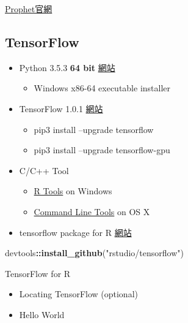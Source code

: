 \documentclass[]{book}
\newenvironment{Shaded}{\begin{snugshade}}{\end{snugshade}}
\newcommand{\KeywordTok}[1]{\textcolor[rgb]{0.13,0.29,0.53}{\textbf{#1}}}
\newcommand{\NormalTok}[1]{#1}
\newcommand{\OperatorTok}[1]{\textcolor[rgb]{0.81,0.36,0.00}{\textbf{#1}}}
\newcommand{\StringTok}[1]{\textcolor[rgb]{0.31,0.60,0.02}{#1}}
\providecommand{\tightlist}{%
  \setlength{\itemsep}{0pt}\setlength{\parskip}{0pt}}
\begin{document}
\href{https://facebookincubator.github.io/prophet/}{Prophet官網}

\hypertarget{tensorflow}{%
\subsection{TensorFlow}\label{tensorflow}}

\begin{itemize}
\tightlist
\item
  Python 3.5.3 \textbf{64 bit} \href{https://www.python.org/downloads/release/python-353/}{網站}

  \begin{itemize}
  \tightlist
  \item
    Windows x86-64 executable installer
  \end{itemize}
\item
  TensorFlow 1.0.1 \href{https://www.tensorflow.org/install/}{網站}

  \begin{itemize}
  \tightlist
  \item
    pip3 install --upgrade tensorflow
  \item
    pip3 install --upgrade tensorflow-gpu
  \end{itemize}
\item
  C/C++ Tool

  \begin{itemize}
  \tightlist
  \item
    \href{https://cran.r-project.org/bin/windows/Rtools/}{R Tools} on Windows
  \item
    \href{http://osxdaily.com/2014/02/12/install-command-line-tools-mac-os-x/}{Command Line Tools} on OS X
  \end{itemize}
\item
  tensorflow package for R \href{https://rstudio.github.io/tensorflow/index.html}{網站}
\end{itemize}

\begin{Shaded}
\begin{Highlighting}[]
\NormalTok{devtools}\OperatorTok{::}\KeywordTok{install_github}\NormalTok{(}\StringTok{"rstudio/tensorflow"}\NormalTok{)}
\end{Highlighting}
\end{Shaded}

TensorFlow for R

\begin{itemize}
\tightlist
\item
  Locating TensorFlow (optional)
\item
  Hello World
\end{itemize}
\end{document}
